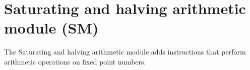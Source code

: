 %

\chapter{Saturating and halving arithmetic module (SM)}
\label{module:SM}

The Saturating and halving arithmetic module adds instructions that perform
arithmetic operations on fixed point numbers.

\tbd
